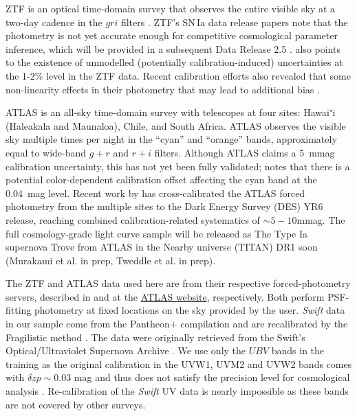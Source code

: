 \documentclass[twocolumn,tighten,times,floatfix]{aastex631}
\begin{document}
%
ZTF is an optical time-domain survey that observes the entire visible sky at a two-day cadence in the $gri$ filters \citep{Bellm19}. ZTF's SN\,Ia data release papers note that the photometry is not yet accurate enough for competitive cosmological parameter inference, which will be provided in a subsequent Data Release 2.5 \citep{Rigault25}. \citet{Kenworthy25} also points to the existence of unmodelled (potentially calibration-induced) uncertainties at the 1-2\% level in the ZTF data. Recent calibration efforts also revealed that some non-linearity effects in their photometry that may lead to additional bias \citep{Lacroix25}. %

ATLAS is an all-sky time-domain survey with telescopes at four sites: Hawaiʻi (Haleakala and Maunaloa), Chile, and South Africa.  ATLAS observes the visible sky multiple times per night in the ``cyan'' and ``orange'' bands, approximately equal to wide-band $g+r$ and $r+i$ filters.  Although ATLAS claims a 5~mmag calibration uncertainty, this has not yet been fully validated; \citet{Scolnic25} notes that there is a potential color-dependent calibration offset affecting the cyan band at the 0.04~mag level. Recent work by \cite{Marlin25} has cross-calibrated the ATLAS forced photometry from the multiple sites to the Dark Energy Survey (DES) YR6 release, reaching combined calibration-related systematics of $\sim 5-10$mmag. The full cosmology-grade light curve sample will be released as The Type Ia supernova Trove from ATLAS in the Nearby universe (TITAN) DR1 soon (Murakami et al. in prep, Tweddle et al. in prep).


The ZTF and ATLAS data used here are from their respective forced-photometry servers, described in \citet{Masci19} and at the \href{fallingstar.com}{ATLAS website}, respectively. Both perform PSF-fitting photometry at fixed locations on the sky provided by the user. {\it Swift} data in our sample come from the Pantheon$+$ compilation \citep{Scolnic22} and are recalibrated by the Fragilistic method \citep{Brout21}.  The data were originally retrieved from the Swift's Optical/Ultraviolet Supernova Archive \citep[{\tt SOUSA};][]{Brown14}. We use only the $UBV$ bands in the training as the original calibration in the UVW1, UVM2 and UVW2 bands comes with $\delta zp \sim0.03$ mag and thus does not satisfy the precision level for cosmological analysis \citep{Brown09, Brown10, Brown14}. Re-calibration of the {\it Swift} UV data is nearly impossible as these bands are not covered by other surveys. 
\end{document}
